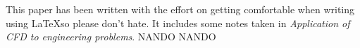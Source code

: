 This paper has been written with the effort on getting comfortable when writing using \LaTeX  so please don't hate. It includes some notes taken in \textit{Application of CFD to engineering problems}. NANDO NANDO